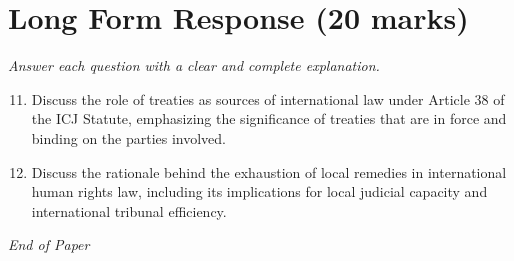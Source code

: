 \documentclass[12pt]{article}
\begin{document}
\section*{Long Form Response (20 marks)}
\textit{Answer each question with a clear and complete explanation.}
\begin{enumerate}[label=\arabic*.]
\setcounter{enumi}{10}
\item Discuss the role of treaties as sources of international law under Article 38 of the ICJ Statute, emphasizing the significance of treaties that are in force and binding on the parties involved.
\item Discuss the rationale behind the exhaustion of local remedies in international human rights law, including its implications for local judicial capacity and international tribunal efficiency.
\end{enumerate}

\vfill
\noindent\textit{End of Paper}
\end{document}

